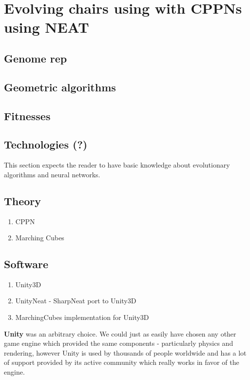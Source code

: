 \section{Evolving chairs using with CPPNs using NEAT }
\subsection{Genome rep}
\subsection{Geometric algorithms}
\subsection{Fitnesses}
\subsection{Technologies (?)}
This section expects the reader to have basic knowledge about evolutionary algorithms and neural networks.

\subsection{Theory}
\begin{enumerate}
    \item CPPN
    \item Marching Cubes
\end{enumerate}



\subsection{Software}
\begin{enumerate}
    \item Unity3D
    \item UnityNeat - SharpNeat port to Unity3D
    \item MarchingCubes implementation for Unity3D
\end{enumerate}
    
\textbf{Unity} was an arbitrary choice. We could just as easily have chosen any other game engine which provided the same components - particularly physics and rendering, however Unity is used by thousands of people worldwide and has a lot of support provided by its active community which really works in favor of the engine.

